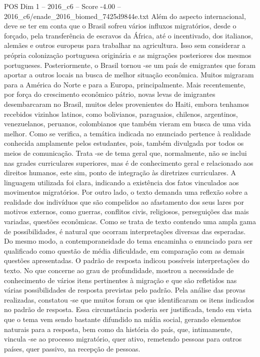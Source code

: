 \begin{textsample}{POS Dim 1 – 2016\_c6 – Score -4.00 – 2016\_c6/enade\_2016\_biomed\_7425d9844e.txt}
Além do aspecto internacional, deve se ter em conta que o Brasil sofreu vários influxos migratórios, desde o forçado, pela transferência de escravos da África, até o incentivado, dos italianos, alemães e outros europeus para trabalhar na agricultura.
Isso sem considerar a própria colonização portuguesa originária e as migrações posteriores dos mesmos portugueses.
Posteriormente, o Brasil tornou -se um país de emigrantes que foram aportar a outros locais na busca de melhor situação econômica.
Muitos migraram para a América do Norte e para a Europa, principalmente.
Mais recentemente, por força do crescimento econômico pátrio, novas levas de imigrantes desembarcaram no Brasil, muitos deles provenientes do Haiti, embora tenhamos recebidos vizinhos latinos, como bolivianos, paraguaios, chilenos, argentinos, venezuelanos, peruanos, colombianos que também vieram em busca de uma vida melhor.
Como se verifica, a temática indicada no enunciado pertence à realidade conhecida amplamente pelos estudantes, pois, também divulgada por todos os meios de comunicação.
Trata -se de tema geral que, normalmente, não se inclui nas grades curriculares superiores, mas é de conhecimento geral e relacionado aos direitos humanos, este sim, ponto de integração às diretrizes curriculares.
A linguagem utilizada foi clara, indicando a existência dos fatos vinculados aos movimentos migratórios.
Por outro lado, o texto demanda uma reflexão sobre a realidade dos indivíduos que são compelidos ao afastamento dos seus lares por motivos externos, como guerras, conflitos civis, religiosos, perseguições das mais variadas, questões econômicas.
Como se trata de texto contendo uma ampla gama de possibilidades, é natural que ocorram interpretações diversas das esperadas.
Do mesmo modo, a contemporaneidade do tema encaminha o enunciado para ser qualificado como questão de média dificuldade, em comparação com as demais questões apresentadas.
O padrão de resposta indicou possíveis interpretações do texto.
No que concerne ao grau de profundidade, mostrou a necessidade de conhecimento de vários itens pertinentes à migração e que são refletidos nas várias possibilidades de resposta previstas pelo padrão.
Pela análise das provas realizadas, constatou -se que muitos foram os que identificaram os itens indicados no padrão de resposta.
Essa circunstância poderia ser justificada, tendo em vista que o tema vem sendo bastante difundido na mídia social, gerando elementos naturais para a resposta, bem como da história do país, que, intimamente, vincula -se ao processo migratório, quer ativo, remetendo pessoas para outros países, quer passivo, na recepção de pessoas.

\end{textsample}
